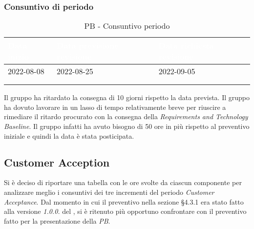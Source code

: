 {            \subsubsection{Consuntivo di periodo} {
                \setlength{\freewidth}{\dimexpr\textwidth-30\tabcolsep}
                \renewcommand{\arraystretch}{1.0}
                \setlength{\aboverulesep}{0pt}
                \setlength{\belowrulesep}{0pt}
                \begin{longtable}{C{.4\freewidth} C{.4\freewidth} C{.4\freewidth}}
                \toprule
                \textcolor{white}{\textbf{Data inizio}}&
                \textcolor{white}{\textbf{Data previsione revisione}}&
                \textcolor{white}{\textbf{Data richiesta revisione}} \\
                \toprule
                \endhead
                    
                2022-08-08 & 2022-08-25 & 2022-09-05 \\
                \\
                \caption{PB - Consuntivo periodo}
          
                \end{longtable}
                Il gruppo ha ritardato la consegna di 10 giorni rispetto la data prevista. Il gruppo ha dovuto lavorare in un lasso di tempo relativamente breve per riuscire a rimediare il ritardo 
                procurato con la consegna della \textit{Requirements and Technology Baseline}. Il gruppo infatti ha avuto bisogno di 50 ore in più rispetto al preventivo iniziale e quindi la data è stata posticipata.
                }
        \subsection{Customer Acception} {
            Si è deciso di riportare una tabella con le ore svolte da ciascun componente per analizzare meglio i consuntivi dei tre incrementi del periodo \textit{Customer Acceptance}.
            Dal momento in cui il preventivo nella sezione \S 4.3.1 era stato fatto alla versione \textit{1.0.0.} del \PdP, 
            si è ritenuto più opportuno confrontare con il preventivo fatto per la presentazione della \textit{PB}.
}}
